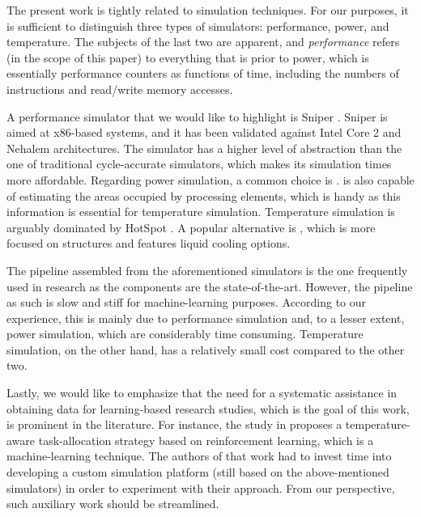 The present work is tightly related to simulation techniques. For our purposes,
it is sufficient to distinguish three types of simulators: performance, power,
and temperature. The subjects of the last two are apparent, and
\emph{performance} refers (in the scope of this paper) to everything that is
prior to power, which is essentially performance counters as functions of time,
including the numbers of instructions and read/write memory accesses.

A performance simulator that we would like to highlight is Sniper
\cite{carlson2011}. Sniper is aimed at x86-based systems, and it has been
validated against Intel Core 2 and Nehalem architectures. The simulator has a
higher level of abstraction than the one of traditional cycle-accurate
simulators, which makes its simulation times more affordable. Regarding power
simulation, a common choice is  \cite{li2009}.  is also
capable of estimating the areas occupied by processing elements, which is handy
as this information is essential for temperature simulation. Temperature
simulation is arguably dominated by HotSpot \cite{skadron2004}. A popular
alternative is  \cite{sridhar2010}, which is more focused on 
structures and features liquid cooling options.

The pipeline assembled from the aforementioned simulators is the one frequently
used in research as the components are the state-of-the-art. However, the
pipeline as such is slow and stiff for machine-learning purposes. According to
our experience, this is mainly due to performance simulation and, to a lesser
extent, power simulation, which are considerably time consuming. Temperature
simulation, on the other hand, has a relatively small cost compared to the other
two.

Lastly, we would like to emphasize that the need for a systematic assistance in
obtaining data for learning-based research studies, which is the goal of this
work, is prominent in the literature. For instance, the study in \cite{lu2015}
proposes a temperature-aware task-allocation strategy based on reinforcement
learning, which is a machine-learning technique. The authors of that work had to
invest time into developing a custom simulation platform (still based on the
above-mentioned simulators) in order to experiment with their approach. From our
perspective, such auxiliary work should be streamlined.
